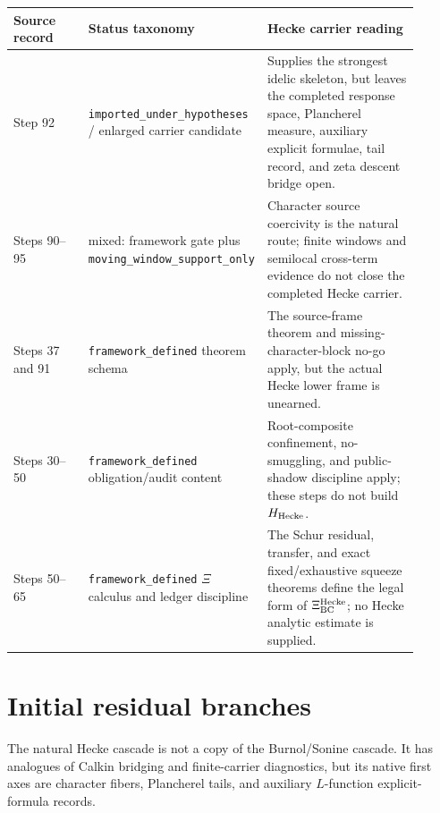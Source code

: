 \documentclass[11pt]{article}
\newcommand{\XiH}{\Xi_{\rm BC}^{\rm Hecke}}
\begin{document}
\begin{center}
\begin{tabular}{p{0.22\linewidth}p{0.22\linewidth}p{0.46\linewidth}}
\toprule
Source record & Status taxonomy & Hecke carrier reading\\
\midrule
Step 92 & \texttt{imported\_under\_hypotheses} / enlarged carrier candidate & Supplies the strongest idelic skeleton, but leaves the completed response space, Plancherel measure, auxiliary explicit formulae, tail record, and zeta descent bridge open.\\
Steps 90--95 & mixed: framework gate plus \texttt{moving\_window\_support\_only} & Character source coercivity is the natural route; finite windows and semilocal cross-term evidence do not close the completed Hecke carrier.\\
Steps 37 and 91 & \texttt{framework\_defined} theorem schema & The source-frame theorem and missing-character-block no-go apply, but the actual Hecke lower frame is unearned.\\
Steps 30--50 & \texttt{framework\_defined} obligation/audit content & Root-composite confinement, no-smuggling, and public-shadow discipline apply; these steps do not build \(H_{\rm Hecke}\).\\
Steps 50--65 & \texttt{framework\_defined} \(\Xi\) calculus and ledger discipline & The Schur residual, transfer, and exact fixed/exhaustive squeeze theorems define the legal form of \(\XiH\); no Hecke analytic estimate is supplied.\\
\bottomrule
\end{tabular}
\end{center}

\section{Initial residual branches}

The natural Hecke cascade is not a copy of the Burnol/Sonine cascade.  It has analogues of Calkin bridging and finite-carrier diagnostics, but its native first axes are character fibers, Plancherel tails, and auxiliary \(L\)-function explicit-formula records.
\end{document}
